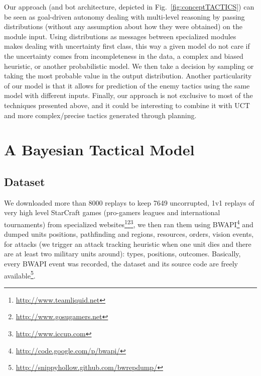 Our approach (and bot architecture, depicted in Fig.~\ref{fig:conceptTACTICS}) can be seen as goal-driven autonomy \cite{Weber2010cr} dealing with multi-level reasoning by passing distributions (without any assumption about how they were obtained) on the module input. Using distributions as messages between specialized modules makes dealing with uncertainty first class, this way a given model do not care if the uncertainty comes from incompleteness in the data, a complex and biased heuristic, or another probabilistic model. We then take a decision by sampling or taking the most probable value in the output distribution. Another particularity of our model is that it allows for prediction of the enemy tactics using the same model with different inputs. Finally, our approach is not exclusive to most of the techniques presented above, and it could be interesting to combine it with UCT \cite{Balla_uctfor} and more complex/precise tactics generated through planning.

\section{A Bayesian Tactical Model}
\subsection{Dataset}
We downloaded more than 8000 replays to keep 7649 uncorrupted, 1v1 replays of very high level StarCraft games (pro-gamers leagues and international tournaments) from specialized websites\footnote{\url{http://www.teamliquid.net}}\footnote{\url{http://www.gosugamers.net}}\footnote{\url{http://www.iccup.com}}, we then ran them using BWAPI\footnote{\url{http://code.google.com/p/bwapi/}} and dumped units positions, pathfinding and regions, resources, orders, vision events, for attacks (we trigger an attack tracking heuristic when one unit dies and there are at least two military units around): types, positions, outcomes. Basically, every BWAPI event was recorded, the dataset and its source code are freely available\footnote{\url{http://snippyhollow.github.com/bwrepdump/}}. 

